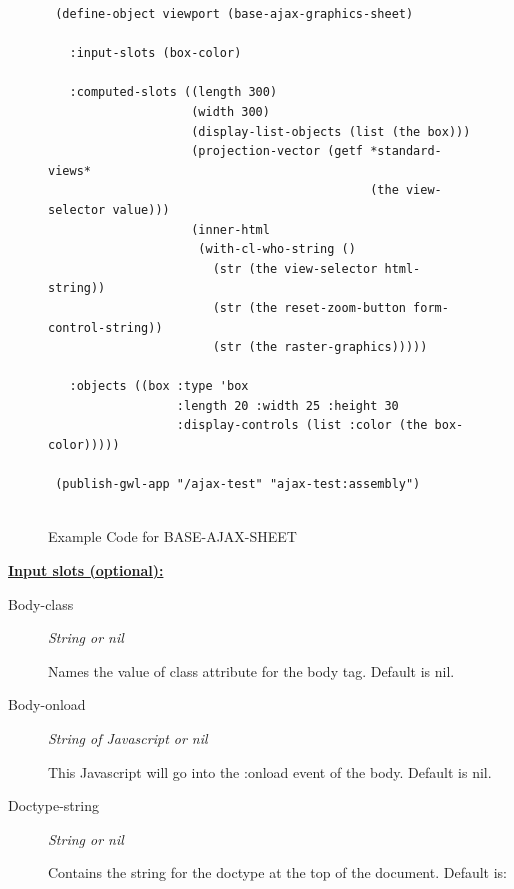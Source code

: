 \documentclass [11pt]{book}
\begin{document}
\begin{itemize}
\begin{figure}
\begin{lrbox}{\boxedverb}
\begin{minipage}{\linewidth}
{\begin{verbatim}
 (define-object viewport (base-ajax-graphics-sheet)
  
   :input-slots (box-color)

   :computed-slots ((length 300)
                    (width 300)
                    (display-list-objects (list (the box)))
                    (projection-vector (getf *standard-views* 
                                             (the view-selector value)))
                    (inner-html
                     (with-cl-who-string ()
                       (str (the view-selector html-string))
                       (str (the reset-zoom-button form-control-string))
                       (str (the raster-graphics)))))
  
   :objects ((box :type 'box 
                  :length 20 :width 25 :height 30
                  :display-controls (list :color (the box-color)))))
   
 (publish-gwl-app "/ajax-test" "ajax-test:assembly")


\end{verbatim}}
\end{minipage}
\end{lrbox}
\fbox{\usebox{\boxedverb}}

\caption{Example Code for BASE-AJAX-SHEET}

\label{fig:example-code-BASE-AJAX-SHEET}

\end{figure}





\textbf{
\underline{Input slots (optional):}}

\begin{description}

\item [Body-class]
\emph{String or nil}

 Names the value of class attribute for the body tag. Default is nil.




\item [Body-onload]
\emph{String of Javascript or nil}

 This Javascript will go into the :onload event of the body.
Default is nil.




\item [Doctype-string]
\emph{String or nil}

 Contains the string for the doctype at the top of the document. Default is:


\end{description}
\end{itemize}
\end{document}

